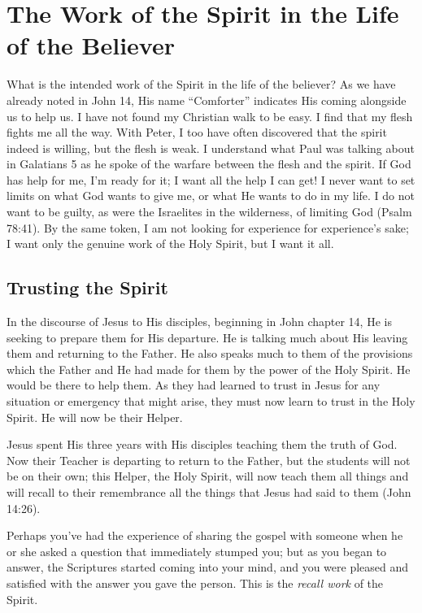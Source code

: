 \chapter{The Work of the Spirit in the Life of the Believer}

What is the intended work of the Spirit in the life of the
believer? As we have already noted in John 14, His name
“Comforter” indicates His coming alongside us to help us.
I have not found my Christian walk to be easy. I find that
my flesh fights me all the way. With Peter, I too have often
discovered that the spirit indeed is willing, but the flesh is
weak. I understand what Paul was talking about in Galatians
5 as he spoke of the warfare between the flesh and the
spirit. If God has help for me, I’m ready for it; I want all the
help I can get! I never want to set limits on what God wants
to give me, or what He wants to do in my life. I do not want
to be guilty, as were the Israelites in the wilderness, of limiting
God (Psalm 78:41). By the same token, I am not looking
for experience for experience’s sake; I want only the genuine
work of the Holy Spirit, but I want it all.


\section*{Trusting the Spirit}

In the discourse of Jesus to His disciples, beginning in
John chapter 14, He is seeking to prepare them for His
departure. He is talking much about His leaving them and
returning to the Father. He also speaks much to them of the
provisions which the Father and He had made for them by
the power of the Holy Spirit. He would be there to help
them. As they had learned to trust in Jesus for any situation
or emergency that might arise, they must now learn to trust
in the Holy Spirit. He will now be their Helper.

Jesus spent His three years with His disciples teaching
them the truth of God. Now their Teacher is departing to
return to the Father, but the students will not be on their
own; this Helper, the Holy Spirit, will now teach them all
things and will recall to their remembrance all the things
that Jesus had said to them (John 14:26).

Perhaps you’ve had the experience of sharing the gospel
with someone when he or she asked a question that immediately
stumped you; but as you began to answer, the Scriptures
started coming into your mind, and you were pleased
and satisfied with the answer you gave the person. This is
the \emph{recall work} of the Spirit.

